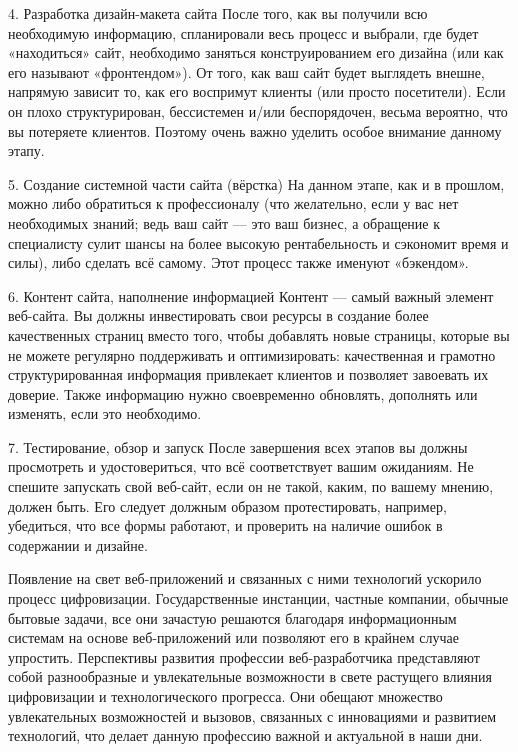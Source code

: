 \documentclass[referat, times]{SCWorks}
\begin{document}
4. Разработка дизайн-макета сайта
После того, как вы получили всю необходимую информацию,
спланировали весь процесс и выбрали, где будет «находиться» сайт, необходимо
заняться конструированием его дизайна (или как его называют «фронтендом»).
От того, как ваш сайт будет выглядеть внешне, напрямую зависит то, как
его воспримут клиенты (или просто посетители). Если он плохо структурирован,
бессистемен и/или беспорядочен, весьма вероятно, что вы потеряете клиентов.
Поэтому очень важно уделить особое внимание данному этапу.

5. Создание системной части сайта (вёрстка)
На данном этапе, как и в прошлом, можно либо обратиться к
профессионалу (что желательно, если у вас нет необходимых знаний; ведь ваш 
сайт --- это ваш бизнес, а обращение к специалисту сулит шансы на более высокую
рентабельность и сэкономит время и силы), либо сделать всё самому. Этот
процесс также именуют «бэкендом».

6. Контент сайта, наполнение информацией
Контент --- самый важный элемент веб-сайта. Вы должны инвестировать
свои ресурсы в создание более качественных страниц вместо того, чтобы
добавлять новые страницы, которые вы не можете регулярно поддерживать и
оптимизировать: качественная и грамотно структурированная информация
привлекает клиентов и позволяет завоевать их доверие. Также информацию
нужно своевременно обновлять, дополнять или изменять, если это необходимо.

7. Тестирование, обзор и запуск
После завершения всех этапов вы должны просмотреть и удостовериться,
что всё соответствует вашим ожиданиям.
Не спешите запускать свой веб-сайт, если он не такой, каким, по вашему
мнению, должен быть. Его следует должным образом протестировать, например,
убедиться, что все формы работают, и проверить на наличие ошибок в
содержании и дизайне\cite{13}.



\conclusion
Появление на свет веб-приложений и связанных с ними технологий ускорило процесс цифровизации. Государственные инстанции, частные компании, обычные бытовые задачи, все они зачастую решаются благодаря информационным системам на основе веб-приложений или позволяют его в крайнем случае упростить.
Перспективы развития профессии веб-разработчика представляют собой разнообразные и увлекательные возможности в свете растущего влияния цифровизации и технологического прогресса. Они обещают множество увлекательных возможностей и вызовов, связанных с инновациями и развитием технологий, что делает данную профессию важной и актуальной в наши дни.

\nocite{*}




\appendix
\end{document}
